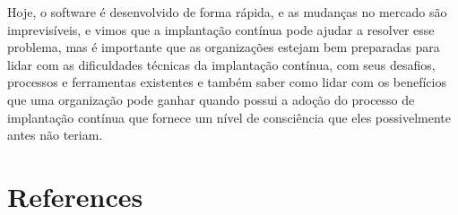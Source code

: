 \documentclass[12pt]{article}
\begin{document}
Hoje, o software é desenvolvido de forma rápida, e as mudanças no mercado são imprevisíveis, e vimos que a implantação contínua pode ajudar a resolver esse problema, mas é importante que as organizações estejam bem preparadas para lidar com as dificuldades técnicas da implantação contínua, com seus desafios, processos e ferramentas existentes e também saber como lidar com os benefícios que  uma organização pode ganhar quando  possui a adoção do processo de implantação contínua que fornece um nível de consciência que eles possivelmente antes não teriam.


\section{References}


\end{document}
